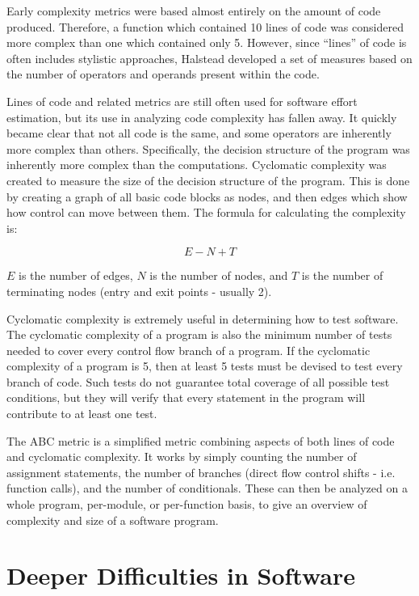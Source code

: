 Early complexity metrics were based almost entirely on the amount of code produced.  Therefore, a function which contained 10 lines of code was considered more complex than one which contained only 5.  However, since ``lines'' of code is often includes stylistic approaches, Halstead developed a set of measures based on the number of operators and operands present within the code.\cite{kearney}  

Lines of code and related metrics are still often used for software effort estimation, but its use in analyzing code complexity has fallen away.  It quickly became clear that not all code is the same, and some operators are inherently more complex than others.  Specifically, the decision structure of the program was inherently more complex than the computations.  Cyclomatic complexity was created to measure the size of the decision structure of the program.\cite{mccabe}  This is done by creating a graph of all basic code blocks as nodes, and then edges which show how control can move between them.  The formula for calculating the complexity is:

$$E - N + T$$

$E$ is the number of edges, $N$ is the number of nodes, and $T$ is the number of terminating nodes (entry and exit points - usually 2).   

Cyclomatic complexity is extremely useful in determining how to test software.  The cyclomatic complexity of a program is also the minimum number of tests needed to cover every control flow branch of a program.  If the cyclomatic complexity of a program is 5, then at least 5 tests must be devised to test every branch of code.  Such tests do not guarantee total coverage of all possible test conditions, but they will verify that every statement in the program will contribute to at least one test.

The ABC metric is a simplified metric combining aspects of both lines of code and cyclomatic complexity.  It works by simply counting the number of assignment statements, the number of branches (direct flow control shifts - i.e. function calls), and the number of conditionals.\cite[pg.~2--3]{fitzpatrick}  These can then be analyzed on a whole program, per-module, or per-function basis, to give an overview of complexity and size of a software program.

\section{Deeper Difficulties in Software}

